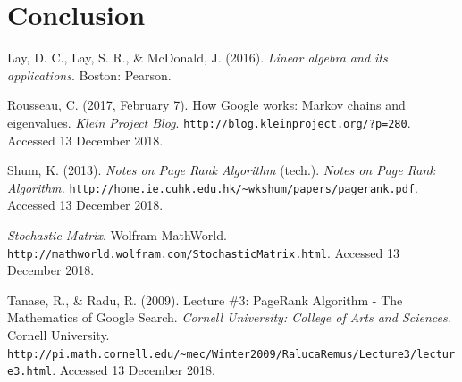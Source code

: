 \documentclass{article}
\begin{document}
\section{Conclusion}






\begin{thebibliography}{4}


Lay, D. C., Lay, S. R., \& McDonald, J. (2016). \textit{Linear algebra and its applications}. Boston: Pearson.

Rousseau, C. (2017, February 7). How Google works: Markov chains and eigenvalues. \textit{Klein Project Blog}. \texttt{http://blog.kleinproject.org/?p=280}. Accessed 13 December 2018.

Shum, K. (2013). \textit{Notes on Page Rank Algorithm} (tech.). \textit{Notes on Page Rank Algorithm.} \texttt{http://home.ie.cuhk.edu.hk/\~{}wkshum/papers/pagerank.pdf}. Accessed 13 December 2018.

\textit{Stochastic Matrix}. Wolfram MathWorld. \texttt{http://mathworld.wolfram.com/StochasticMatrix.html}. Accessed 13 December 2018.

Tanase, R., \& Radu, R. (2009). Lecture \#3: PageRank Algorithm - The Mathematics of Google Search. 
\textit{Cornell University: College of Arts and Sciences}. Cornell University. \texttt{http://pi.math.cornell.edu/\~{}mec/Winter2009/RalucaRemus/Lecture3/lecture3.html}. Accessed 13 December 2018.

\end{thebibliography}
\end{document}
